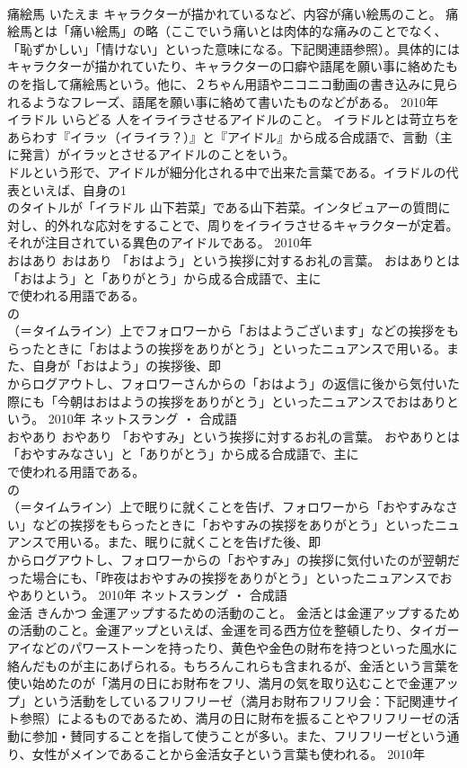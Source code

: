 \documentclass[8pt]{extreport}
\begin{document}
\begin{CJK}{UTF8}{min}
\\	痛絵馬	いたえま	キャラクターが描かれているなど、内容が痛い絵馬のこと。	痛絵馬とは「痛い絵馬」の略（ここでいう痛いとは肉体的な痛みのことでなく、「恥ずかしい」「情けない」といった意味になる。下記関連語参照）。具体的にはキャラクターが描かれていたり、キャラクターの口癖や語尾を願い事に絡めたものを指して痛絵馬という。他に、２ちゃん用語やニコニコ動画の書き込みに見られるようなフレーズ、語尾を願い事に絡めて書いたものなどがある。	2010年	
\\	イラドル	いらどる	人をイライラさせるアイドルのこと。	イラドルとは苛立ちをあらわす『イラッ（イライラ？）』と『アイドル』から成る合成語で、言動（主に発言）がイラッとさせるアイドルのことをいう。
\\	ドルという形で、アイドルが細分化される中で出来た言葉である。イラドルの代表といえば、自身の1
\\	のタイトルが「イラドル 山下若菜」である山下若菜。インタビュアーの質問に対し、的外れな応対をすることで、周りをイライラさせるキャラクターが定着。それが注目されている異色のアイドルである。	2010年	
\\	おはあり	おはあり	「おはよう」という挨拶に対するお礼の言葉。	おはありとは「おはよう」と「ありがとう」から成る合成語で、主に
\\	で使われる用語である。
\\	の
\\	（＝タイムライン）上でフォロワーから「おはようございます」などの挨拶をもらったときに「おはようの挨拶をありがとう」といったニュアンスで用いる。また、自身が「おはよう」の挨拶後、即
\\	からログアウトし、フォロワーさんからの「おはよう」の返信に後から気付いた際にも「今朝はおはようの挨拶をありがとう」といったニュアンスでおはありという。	2010年	ネットスラング ・ 合成語	
\\	おやあり	おやあり	「おやすみ」という挨拶に対するお礼の言葉。	おやありとは「おやすみなさい」と「ありがとう」から成る合成語で、主に
\\	で使われる用語である。
\\	の
\\	（＝タイムライン）上で眠りに就くことを告げ、フォロワーから「おやすみなさい」などの挨拶をもらったときに「おやすみの挨拶をありがとう」といったニュアンスで用いる。また、眠りに就くことを告げた後、即
\\	からログアウトし、フォロワーからの「おやすみ」の挨拶に気付いたのが翌朝だった場合にも、「昨夜はおやすみの挨拶をありがとう」といったニュアンスでおやありという。	2010年	ネットスラング ・ 合成語	
\\	金活	きんかつ	金運アップするための活動のこと。	金活とは金運アップするための活動のこと。金運アップといえば、金運を司る西方位を整頓したり、タイガーアイなどのパワーストーンを持ったり、黄色や金色の財布を持つといった風水に絡んだものが主にあげられる。もちろんこれらも含まれるが、金活という言葉を使い始めたのが「満月の日にお財布をフリ、満月の気を取り込むことで金運アップ」という活動をしているフリフリーゼ（満月お財布フリフリ会：下記関連サイト参照）によるものであるため、満月の日に財布を振ることやフリフリーゼの活動に参加・賛同することを指して使うことが多い。また、フリフリーゼという通り、女性がメインであることから金活女子という言葉も使われる。	2010年	

\end{CJK}
\end{document}
